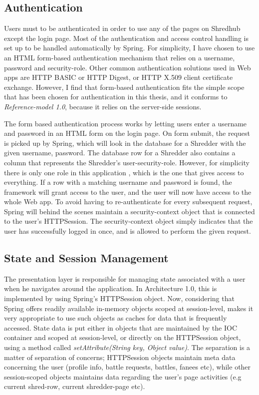 \subsection{Authentication}
Users must to be authenticated in order to use any of the pages on Shredhub except the login page. Most of the authentication and access control handling is set up to be handled automatically by Spring. For simplicity, I have chosen to use an HTML form-based authentication mechanism that relies on a username, password and security-role. Other common authentication solutions used in Web apps are HTTP BASIC or HTTP Digest, or HTTP X.509 client certificate exchange. However, I find that form-based authentication fits the simple scope that has been chosen for authentication in this thesis, and it conforms to \textit{Reference-model 1.0}, because it relies on the server-side sessions.

The form based authentication process works by letting users enter a username and password in an HTML form on the login page. On form submit, the request is picked up by Spring, which will look in the database for a Shredder with the given username, password. The database row for a Shredder also contains a column that represents the Shredder's user-security-role. However, for simplicity there is only one role in this application , which is the one that gives access to everything. If a row with a matching username and password is found, the framework will grant access to the user, and the user will now have access to the whole Web app. To avoid having to re-authenticate for every subsequent request, Spring will behind the scenes maintain a security-context object that is connected to the user's HTTPSession. The security-context object simply indicates that the user has successfully logged in once, and is allowed to perform the given request. 
		  
\subsection{State and Session Management}
The presentation layer is responsible for managing state associated with a user when he navigates around the application. In Architecture 1.0, this is implemented by using Spring's HTTPSession object. Now, considering that Spring offers readily available in-memory objects scoped at session-level, makes it very appropriate to use such objects as caches for data that is frequently accessed. State data is put either in objects that are maintained by the IOC container and scoped at session-level, or directly on the HTTPSession object, using a method called \textit{setAttribute(String key, Object value)}. The separation is a matter of separation of concerns; HTTPSession objects maintain meta data concerning the user (profile info, battle requests, battles, fanees etc), while other session-scoped objects maintains data regarding the user's page activities (e.g current shred-row, current shredder-page etc).

